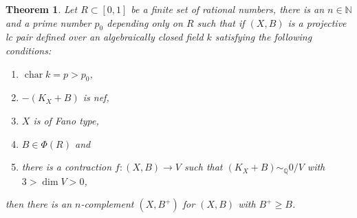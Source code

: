 \documentclass[letterpaper,reqno,12pt]{amsart}
\DeclareMathOperator{\chara}{char}
\numberwithin{equation}{section}
\theoremstyle{plain}
\newtheorem{theorem}{Theorem}[section]
\begin{document}
\begin{theorem}
\label{fibcomp}
    Let $R\subset [0,1]$ be a finite set of rational numbers, there is an $n\in\mathbb N$ and a prime number $p_0$ depending only on $R$ such that if $(X,B)$ is a projective lc pair defined over an algebraically closed field $k$ satisfying the following conditions:
    \begin{enumerate}
        \item $\chara k=p>p_0$,
        \item $-(K_X+B)$ is nef,
        \item $X$ is of Fano type,
        \item $B\in \Phi(R)$ and
        \item there is a contraction $f:(X,B)\to V$ such that $(K_X+B)\sim_{\mathbb Q} 0/V$ with $3>\dim V>0$,
    \end{enumerate}
    then there is an $n$-complement $(X,B^+)$ for $(X,B)$ with $B^+\geq B$.
\end{theorem}
\end{document}

